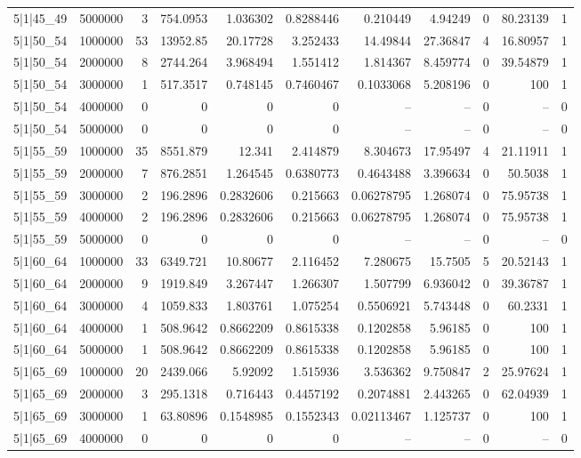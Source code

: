 \begin{tabular}{lrrrrrrrrrr}
5|1|45\_49 & 5000000 & 3 & 754.0953 & 1.036302 & 0.8288446 & 0.210449 & 4.94249 & 0 & 80.23139 & 1 \\
5|1|50\_54 & 1000000 & 53 & 13952.85 & 20.17728 & 3.252433 & 14.49844 & 27.36847 & 4 & 16.80957 & 1 \\
5|1|50\_54 & 2000000 & 8 & 2744.264 & 3.968494 & 1.551412 & 1.814367 & 8.459774 & 0 & 39.54879 & 1 \\
5|1|50\_54 & 3000000 & 1 & 517.3517 & 0.748145 & 0.7460467 & 0.1033068 & 5.208196 & 0 & 100 & 1 \\
5|1|50\_54 & 4000000 & 0 & 0 & 0 & 0 & -- & -- & 0 & -- & 0 \\
5|1|50\_54 & 5000000 & 0 & 0 & 0 & 0 & -- & -- & 0 & -- & 0 \\
5|1|55\_59 & 1000000 & 35 & 8551.879 & 12.341 & 2.414879 & 8.304673 & 17.95497 & 4 & 21.11911 & 1 \\
5|1|55\_59 & 2000000 & 7 & 876.2851 & 1.264545 & 0.6380773 & 0.4643488 & 3.396634 & 0 & 50.5038 & 1 \\
5|1|55\_59 & 3000000 & 2 & 196.2896 & 0.2832606 & 0.215663 & 0.06278795 & 1.268074 & 0 & 75.95738 & 1 \\
5|1|55\_59 & 4000000 & 2 & 196.2896 & 0.2832606 & 0.215663 & 0.06278795 & 1.268074 & 0 & 75.95738 & 1 \\
5|1|55\_59 & 5000000 & 0 & 0 & 0 & 0 & -- & -- & 0 & -- & 0 \\
5|1|60\_64 & 1000000 & 33 & 6349.721 & 10.80677 & 2.116452 & 7.280675 & 15.7505 & 5 & 20.52143 & 1 \\
5|1|60\_64 & 2000000 & 9 & 1919.849 & 3.267447 & 1.266307 & 1.507799 & 6.936042 & 0 & 39.36787 & 1 \\
5|1|60\_64 & 3000000 & 4 & 1059.833 & 1.803761 & 1.075254 & 0.5506921 & 5.743448 & 0 & 60.2331 & 1 \\
5|1|60\_64 & 4000000 & 1 & 508.9642 & 0.8662209 & 0.8615338 & 0.1202858 & 5.96185 & 0 & 100 & 1 \\
5|1|60\_64 & 5000000 & 1 & 508.9642 & 0.8662209 & 0.8615338 & 0.1202858 & 5.96185 & 0 & 100 & 1 \\
5|1|65\_69 & 1000000 & 20 & 2439.066 & 5.92092 & 1.515936 & 3.536362 & 9.750847 & 2 & 25.97624 & 1 \\
5|1|65\_69 & 2000000 & 3 & 295.1318 & 0.716443 & 0.4457192 & 0.2074881 & 2.443265 & 0 & 62.04939 & 1 \\
5|1|65\_69 & 3000000 & 1 & 63.80896 & 0.1548985 & 0.1552343 & 0.02113467 & 1.125737 & 0 & 100 & 1 \\
5|1|65\_69 & 4000000 & 0 & 0 & 0 & 0 & -- & -- & 0 & -- & 0 \\

\end{tabular}
